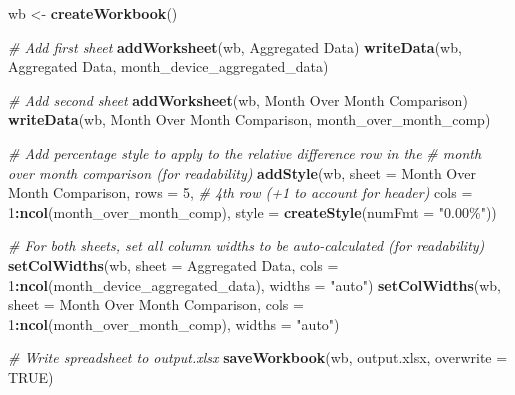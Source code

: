 \documentclass[
]{article}
\newenvironment{Shaded}{\begin{snugshade}}{\end{snugshade}}
\newcommand{\AttributeTok}[1]{\textcolor[rgb]{0.13,0.29,0.53}{#1}}
\newcommand{\CommentTok}[1]{\textcolor[rgb]{0.56,0.35,0.01}{\textit{#1}}}
\newcommand{\ConstantTok}[1]{\textcolor[rgb]{0.56,0.35,0.01}{#1}}
\newcommand{\DecValTok}[1]{\textcolor[rgb]{0.00,0.00,0.81}{#1}}
\newcommand{\FunctionTok}[1]{\textcolor[rgb]{0.13,0.29,0.53}{\textbf{#1}}}
\newcommand{\NormalTok}[1]{#1}
\newcommand{\OtherTok}[1]{\textcolor[rgb]{0.56,0.35,0.01}{#1}}
\newcommand{\SpecialCharTok}[1]{\textcolor[rgb]{0.81,0.36,0.00}{\textbf{#1}}}
\newcommand{\StringTok}[1]{\textcolor[rgb]{0.31,0.60,0.02}{#1}}
\begin{document}
\begin{Shaded}
\begin{Highlighting}[]
\NormalTok{wb }\OtherTok{\textless{}{-}} \FunctionTok{createWorkbook}\NormalTok{()}

\CommentTok{\# Add first sheet}
\FunctionTok{addWorksheet}\NormalTok{(wb, }\StringTok{\textquotesingle{}Aggregated Data\textquotesingle{}}\NormalTok{)}
\FunctionTok{writeData}\NormalTok{(wb, }\StringTok{\textquotesingle{}Aggregated Data\textquotesingle{}}\NormalTok{, month\_device\_aggregated\_data)}

\CommentTok{\# Add second sheet}
\FunctionTok{addWorksheet}\NormalTok{(wb, }\StringTok{\textquotesingle{}Month Over Month Comparison\textquotesingle{}}\NormalTok{)}
\FunctionTok{writeData}\NormalTok{(wb, }\StringTok{\textquotesingle{}Month Over Month Comparison\textquotesingle{}}\NormalTok{, month\_over\_month\_comp)}

\CommentTok{\# Add percentage style to apply to the relative difference row in the}
\CommentTok{\# month over month comparison (for readability)}
\FunctionTok{addStyle}\NormalTok{(wb,}
         \AttributeTok{sheet =} \StringTok{\textquotesingle{}Month Over Month Comparison\textquotesingle{}}\NormalTok{,}
         \AttributeTok{rows =} \DecValTok{5}\NormalTok{, }\CommentTok{\# 4th row (+1 to account for header)}
         \AttributeTok{cols =} \DecValTok{1}\SpecialCharTok{:}\FunctionTok{ncol}\NormalTok{(month\_over\_month\_comp),}
         \AttributeTok{style =} \FunctionTok{createStyle}\NormalTok{(}\AttributeTok{numFmt =} \StringTok{"0.00\%"}\NormalTok{))}

\CommentTok{\# For both sheets, set all column widths to be auto{-}calculated (for readability)}
\FunctionTok{setColWidths}\NormalTok{(wb, }\AttributeTok{sheet =} \StringTok{\textquotesingle{}Aggregated Data\textquotesingle{}}\NormalTok{, }\AttributeTok{cols =} \DecValTok{1}\SpecialCharTok{:}\FunctionTok{ncol}\NormalTok{(month\_device\_aggregated\_data), }\AttributeTok{widths =} \StringTok{"auto"}\NormalTok{)}
\FunctionTok{setColWidths}\NormalTok{(wb, }\AttributeTok{sheet =} \StringTok{\textquotesingle{}Month Over Month Comparison\textquotesingle{}}\NormalTok{, }\AttributeTok{cols =} \DecValTok{1}\SpecialCharTok{:}\FunctionTok{ncol}\NormalTok{(month\_over\_month\_comp), }\AttributeTok{widths =} \StringTok{"auto"}\NormalTok{)}

\CommentTok{\# Write spreadsheet to \textasciigrave{}output.xlsx\textasciigrave{}}
\FunctionTok{saveWorkbook}\NormalTok{(wb, }\StringTok{\textquotesingle{}output.xlsx\textquotesingle{}}\NormalTok{, }\AttributeTok{overwrite =} \ConstantTok{TRUE}\NormalTok{)}
\end{Highlighting}
\end{Shaded}
\end{document}
